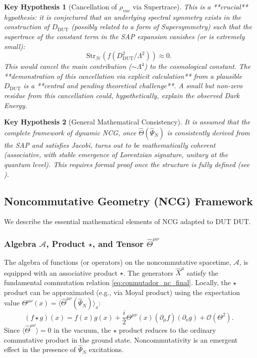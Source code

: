 \documentclass[11pt, a4paper]{article}
\newtheorem{hypothesis}{Key Hypothesis}[section]
\theoremstyle{remark}
\newcommand{\Op}[1]{\hat{#1}}
\newcommand{\Star}{\star}
\newcommand{\Str}{\mathrm{Str}}
\begin{document}
\begin{hypothesis}[Cancellation of \texorpdfstring{$\rho_{vac}$}{rho\_vac} via Supertrace]
    \label{hyp:cc_cancel_final}
    This is a **crucial** hypothesis: it is conjectured that an underlying spectral symmetry exists in the construction of \( D_{\text{DUT}} \) (possibly related to a form of Supersymmetry) such that the supertrace of the constant term in the SAP expansion vanishes (or is extremely small):
    \[ \Str_{\mathcal{H}}(f(D_{\text{DUT}}^2/\Lambda^2)) \approx 0. \]
    This would cancel the main contribution (\(\sim \Lambda^4\)) to the cosmological constant. The **demonstration of this cancellation via explicit calculation** from a plausible \( D_{\text{DUT}} \) is a **central and pending theoretical challenge**. A small but non-zero residue from this cancellation could, hypothetically, explain the observed Dark Energy.
\end{hypothesis}

\begin{hypothesis}[General Mathematical Consistency]
    \label{hyp:math_consistency_final}
    It is assumed that the complete framework of dynamic NCG, once \( \Op{\Theta}(\Op{\Psi}_N) \) is consistently derived from the SAP and satisfies Jacobi, turns out to be mathematically coherent (associative, with stable emergence of Lorentzian signature, unitary at the quantum level). This requires formal proof once the structure is fully defined (see ).
\end{hypothesis}

\subsection{Noncommutative Geometry (NCG) Framework}
\label{subsec:gnc_formalism_final}

We describe the essential mathematical elements of NCG adapted to DUT DUT.

\subsubsection{Algebra \texorpdfstring{$\mathcal{A}$}{A}, Product \texorpdfstring{$\Star$}{Star}, and Tensor \texorpdfstring{$\Op{\Theta}^{\mu\nu}$}{Theta}}
\label{ssubsec:algebra_star_theta_final}
The algebra of functions (or operators) on the noncommutative spacetime, \( \mathcal{A} \), is equipped with an associative product \( \Star \). The generators \( \hat{X}^\mu \) satisfy the fundamental commutation relation \eqref{eq:conmutador_nc_final}. Locally, the \( \Star \) product can be approximated (e.g., via Moyal product) using the expectation value \( \Theta^{\mu\nu}(x) = \langle \Op{\Theta}^{\mu\nu}(\Op{\Psi}_N) \rangle_x \):
\begin{equation} \label{eq:moyal_product_explicit_final}
(f \Star g)(x) = f(x)g(x) + \frac{i}{2}\Theta^{\mu\nu}(x)(\partial_\mu f)(\partial_\nu g) + \mathcal{O}(\Theta^2).
\end{equation}
Since \( \langle \Op{\Theta}^{\mu\nu} \rangle = 0 \) in the vacuum, the \( \Star \) product reduces to the ordinary commutative product in the ground state. Noncommutativity is an emergent effect in the presence of \( \Op{\Psi}_N \) excitations.
\end{document}
